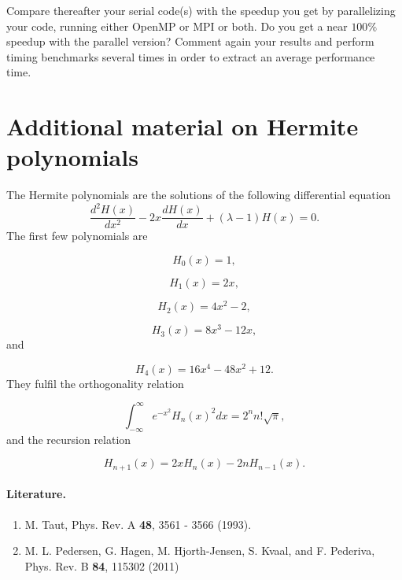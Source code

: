 \documentclass[%
oneside,                 %
final,                   %
10pt]{article}
\begin{document}
Compare thereafter your serial code(s)  with the speedup you get by parallelizing your code, running either OpenMP or MPI or both.
Do you get a near $100\%$ speedup with the parallel version? Comment again your results and perform timing benchmarks several times in order 
to extract  an average performance time. 

\section*{Additional material on Hermite polynomials}

The Hermite polynomials are the solutions of the following differential
equation
\begin{equation}
   \frac{d^2H(x)}{dx^2}-2x\frac{dH(x)}{dx}+
       (\lambda-1)H(x)=0.
   \label{eq:hermite}
\end{equation}
The first few polynomials are

\begin{equation*}
   H_0(x)=1,
\end{equation*}

\begin{equation*}
    H_1(x)=2x,
\end{equation*}

\begin{equation*}
    H_2(x)=4x^2-2,
\end{equation*}

\begin{equation*}
    H_3(x)=8x^3-12x,
\end{equation*}
and

\begin{equation*}
    H_4(x)=16x^4-48x^2+12.
\end{equation*}
They fulfil the orthogonality relation

\begin{equation*}
  \int_{-\infty}^{\infty}e^{-x^2}H_n(x)^2dx=2^nn!\sqrt{\pi},
\end{equation*}
and the recursion relation

\begin{equation*}
  H_{n+1}(x)=2xH_{n}(x)-2nH_{n-1}(x).
\end{equation*}

\paragraph{Literature.}
\begin{enumerate}
 \item M. Taut, Phys. Rev. A \textbf{48}, 3561 - 3566 (1993).

 \item M. L. Pedersen, G. Hagen, M. Hjorth-Jensen, S. Kvaal,  and F. Pederiva, Phys. Rev. B \textbf{84}, 115302 (2011)

\end{enumerate}
\end{document}

